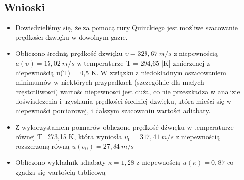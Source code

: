 \documentclass[]{article}
\begin{document}
\subsection{Wnioski}
\begin{itemize}
		\item Dowiedzieliśmy się, że za pomocą rury Quinckiego jest możliwe szacowanie prędkości dzwięku w dowolnym gazie.
		\item  Obliczono średnią prędkość dzwięku \(\upsilon = 329,67\: m/s\) z niepewnością \(u(\upsilon) =15,02 \: m/s\) w temperaturze T = 294,65 [K] zmierzonej z niepewnością u(T) = 0,5 K. W związku z niedokładnym oszacowaniem minimumów w niektórych przypadkach (szczególnie dla małych częstotliwości) wartość niepewności jest duża, co nie przeszkadza w analizie doświadczenia i uzyskania prędkości średniej dzwięku, która mieści się w niepewności pomiarowej, i dalszym szacowaniu wartości adiabaty.
		\item Z wykorzystaniem pomiarów obliczono prędkość dźwięku w temperaturze równej T=273,15 K, która wyniosła  \(\upsilon_0=317,41\: m/s\) z niepewnością rozszerzoną równą \(u(\upsilon_0)=27,84\:m/s\)
		\item Obliczono wykładnik adiabaty \(\kappa = 1,28\) z niepewnością \(u(\kappa)=0,87\) co zgadza się wartością tablicową
	\end{itemize}
\end{document}
